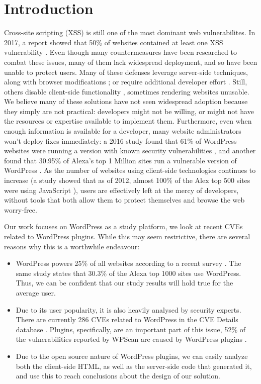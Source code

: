 \section{Introduction}

Cross-site scripting (XSS) is still one of the most dominant web vulnerabilites. In 2017, a report showed that 50\% of websites contained at least one XSS vulnerability \cite{Acunetix}. Even though many countermeasures have been researched to combat these issues, many of them lack widespread deployment, and so have been unable to protect users. Many of these defenses leverage server-side techniques, along with browser modifications \cite{Jim:2007:DSI:1242572.1242654,Nadji:2009}; or require additional developer effort \cite{10.1007/978-3-319-66399-9_7}. Still, others disable client-side functionality \cite{Noscript,Snyder:2017:MWD:3133956.3133966}, sometimes rendering websites unusable. We believe many of these solutions have not seen widespread adoption because they simply are not practical: developers might not be willing, or might not have the resources or expertise available to implement them. Furthermore, even when enough information is available for a developer, many website administrators won't deploy fixes immediately: a 2016 study found that 61\% of WordPress websites were running a version with known security vulnerabilities \cite{Sucuri}, and another found that 30.95\% of Alexa's top 1 Million sites run a vulnerable version of WordPress \cite{wpwhitesecurity}. As the number of websites using client-side technologies continues to increase (a study showed that as of 2012, almost 100\% of the Alex top 500 sites were using JavaScript \cite{Stock:2017:WTI:3241189.3241265}), users are effectively left at the mercy of developers, without tools that both allow them to protect themselves and browse the web worry-free.

Our work focuses on WordPress as a study platform, we look at recent CVEs related to WordPress plugins. While this may seem restrictive, there are several reasons why this is a worthwhile endeavour:
\begin{itemize}
	\item WordPress powers 25\% of all websites according to a recent survey  \cite{w3techs}. The same study states that 30.3\% of the Alexa top 1000 sites use WordPress. Thus, we can be confident that our study results will hold true for the average user.
	\item Due to its user popularity, it is also heavily analysed by security experts. There are currently 286 CVEs related to WordPress in the CVE Details database \cite{cvedetails}. Plugins, specifically, are an important part of this issue, 52\% of the vulnerabilities reported by WPScan are caused by WordPress plugins \cite{wpscan}.
	\item Due to the open source nature of WordPress plugins, we can easily analyze both the client-side HTML, as well as the server-side code that generated it, and use this to reach conclusions about the design of our solution.
	
\end{itemize}

